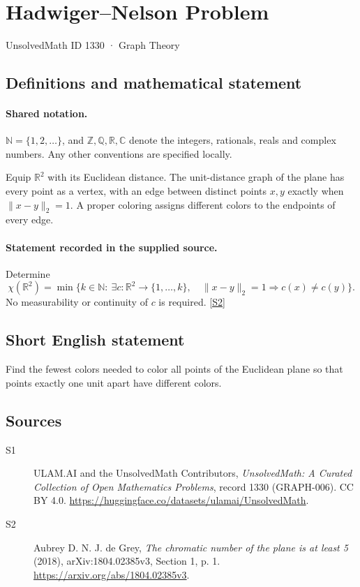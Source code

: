 \documentclass[11pt]{article}
\newcommand{\sref}[2]{\hyperlink{source:#1:#2}{[S#2]}}
\begin{document}
\setcounter{section}{1329}
\section{Hadwiger–Nelson Problem}\label{1330}
{\small\sffamily UnsolvedMath ID 1330 · Graph Theory}
\subsection{Definitions and mathematical statement}

\paragraph{Shared notation.}$\mathbb N=\{1,2,\ldots\}$, and $\mathbb Z,\mathbb Q,\mathbb R,\mathbb C$ denote the integers, rationals, reals and complex numbers. Any other conventions are specified locally.


Equip $\mathbb R^2$ with its Euclidean distance. The unit-distance graph of the plane has every point as a vertex, with an edge between distinct points $x,y$ exactly when $\|x-y\|_2=1$. A proper coloring assigns different colors to the endpoints of every edge.
\paragraph{Statement recorded in the supplied source.}
Determine
\[
 \chi(\mathbb R^2)=\min\bigl\{k\in\mathbb N:\ \exists c:\mathbb R^2\to\{1,\ldots,k\},\quad
 \|x-y\|_2=1\Longrightarrow c(x)\ne c(y)\bigr\}.
\]
No measurability or continuity of $c$ is required. \sref{1330}{2}
\subsection{Short English statement}
Find the fewest colors needed to color all points of the Euclidean plane so that points exactly one unit apart have different colors.
\subsection{Sources}
\begin{description}
\item[\hypertarget{source:1330:1}{S1}] ULAM.AI and the UnsolvedMath Contributors, \emph{UnsolvedMath: A Curated Collection of Open Mathematics Problems}, record 1330 (GRAPH-006). CC BY 4.0. \url{https://huggingface.co/datasets/ulamai/UnsolvedMath}.
\item[\hypertarget{source:1330:2}{S2}] Aubrey D. N. J. de Grey, \emph{The chromatic number of the plane is at least 5} (2018), arXiv:1804.02385v3, Section 1, p. 1. \url{https://arxiv.org/abs/1804.02385v3}.
\end{description}
\label{end:1330}
\end{document}
